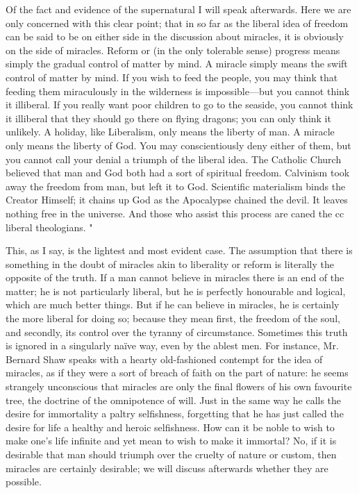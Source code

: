 \documentclass{book}
\begin{document}
Of the fact and evidence of the supernatural I will speak afterwards. Here we are only concerned with this clear point; that in so far as the liberal idea of freedom can be said to be on either side in the discussion about miracles, it is obviously on the side of miracles. Reform or (in the only tolerable sense) progress means simply the gradual control of matter by mind. A miracle simply means the swift control of matter by mind. If you wish to feed the people, you may think that feeding them miraculously in the wilderness is impossible—but you cannot think it illiberal. If you really want poor children to go to the seaside, you cannot think it illiberal that they should go there on flying dragons; you can only think it unlikely. A holiday, like Liberalism, only means the liberty of man. A miracle only means the liberty of God. You may conscientiously deny either of them, but you cannot call your denial a triumph of the liberal idea. The Catholic Church believed that man and God both had a sort of spiritual freedom. Calvinism took away the freedom from man, but left it to God. Scientific materialism binds the Creator Himself; it chains up God as the Apocalypse chained the devil. It leaves nothing free in the universe. And those who assist this process are caned the cc liberal theologians. "

This, as I say, is the lightest and most evident case. The assumption that there is something in the doubt of miracles akin to liberality or reform is literally the opposite of the truth. If a man cannot believe in miracles there is an end of the matter; he is not particularly liberal, but he is perfectly honourable and logical, which are much better things. But if he can believe in miracles, he is certainly the more liberal for doing so; because they mean first, the freedom of the soul, and secondly, its control over the tyranny of circumstance. Sometimes this truth is ignored in a singularly naïve way, even by the ablest men. For instance, Mr. Bernard Shaw speaks with a hearty old-fashioned contempt for the idea of miracles, as if they were a sort of breach of faith on the part of nature: he seems strangely unconscious that miracles are only the final flowers of his own favourite tree, the doctrine of the omnipotence of will. Just in the same way he calls the desire for immortality a paltry selfishness, forgetting that he has just called the desire for life a healthy and heroic selfishness. How can it be noble to wish to make one’s life infinite and yet mean to wish to make it immortal? No, if it is desirable that man should triumph over the cruelty of nature or custom, then miracles are certainly desirable; we will discuss afterwards whether they are possible.
\end{document}
